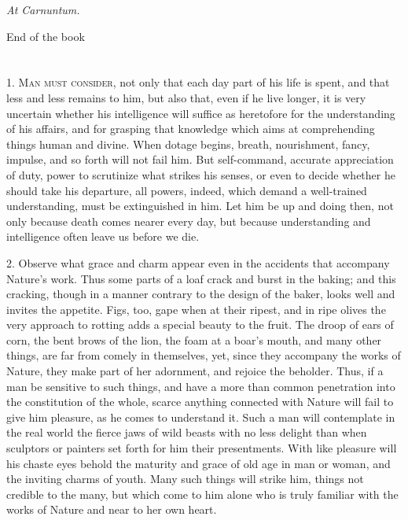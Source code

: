 \documentclass{book}
\newcommand\terminus[1]{\vspace{2em}\emph{#1} \\[2em] \begin{center}End of the \ordinalstring{chapter} book\end{center}}
\begin{document}
\terminus{At Carnuntum.}

\chapter[Man must consider,...]{}

1. \textsc{Man must consider,} not only that each day part of his life is
spent, and that less and less remains to him, but also that, even if
he live longer, it is very uncertain whether his intelligence will
suffice as heretofore for the understanding of his affairs, and for
grasping that knowledge which aims at comprehending things human and
divine. When dotage begins, breath, nourishment, fancy, impulse, and
so forth will not fail him. But self-command, accurate appreciation of
duty, power to scrutinize what strikes his senses, or even to decide
whether he should take his departure, all powers, indeed, which demand
a well-trained understanding, must be extinguished in him. Let him be
up and doing then, not only because death comes nearer every day, but
because understanding and intelligence often leave us before we die.

2. Observe what grace and charm appear even in the accidents that
accompany Nature's work. Thus some parts of a loaf crack and burst in
the baking; and this cracking, though in a manner contrary to the
design of the baker, looks well and invites the appetite. Figs, too,
gape when at their ripest, and in ripe olives the very approach to
rotting adds a special beauty to the fruit. The droop of ears of corn,
the bent brows of the lion, the foam at a boar's mouth, and many other
things, are far from comely in themselves, yet, since they accompany
the works of Nature, they make part of her adornment, and rejoice the
beholder. Thus, if a man be sensitive to such things, and have a more
than common penetration into the constitution of the whole, scarce
anything connected with Nature will fail to give him pleasure, as he
comes to understand it. Such a man will contemplate in the real world
the fierce jaws of wild beasts with no less delight than when
sculptors or painters set forth for him their presentments. With like
pleasure will his chaste eyes behold the maturity and grace of old age
in man or woman, and the inviting charms of youth. Many such things
will strike him, things not credible to the many, but which come to
him alone who is truly familiar with the works of Nature and near to
her own heart.
\end{document}
